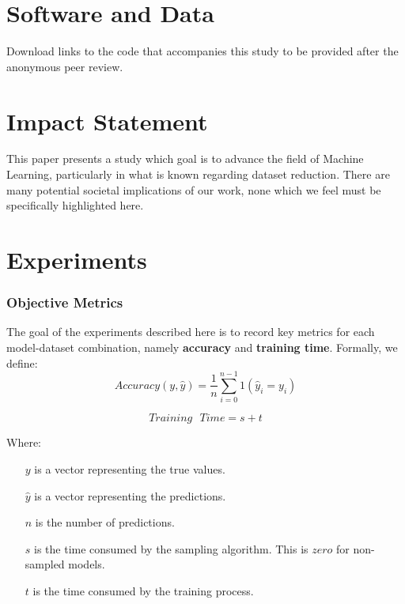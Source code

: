 \documentclass{article}
\theoremstyle{plain}
\theoremstyle{definition}
\theoremstyle{remark}
\begin{document}
\section*{Software and Data}

Download links to the code that accompanies this study to be provided after the anonymous peer review.

\section*{Impact Statement}

This paper presents a study which goal is to advance the field of
Machine Learning, particularly in what is known regarding dataset reduction. There are many potential societal implications
of our work, none which we feel must be specifically highlighted here.






\newpage
\appendix
\onecolumn
\section{Experiments}

\subsubsection{Objective Metrics}

The goal of the experiments described here is to record key metrics for each model-dataset combination, namely \textbf{accuracy} and \textbf{training time}. Formally, we define:
$$
Accuracy(y, \hat{y}) = \frac{1}{n} \sum_{i=0}^{n-1} 1(\hat{y}_i = y_i)
$$

$$
Training\text{ }Time = s + t
$$

Where:

\begin{itemize}

\item[$y$] is a vector representing the true values.
\item[$\hat{y}$] is a vector representing the predictions.
\item[$n$] is the number of predictions.
\item[$s$] is the time consumed by the sampling algorithm. This is $zero$ for non-sampled models.
\item[$t$] is the time consumed by the training process.

\end{itemize}
\end{document}
